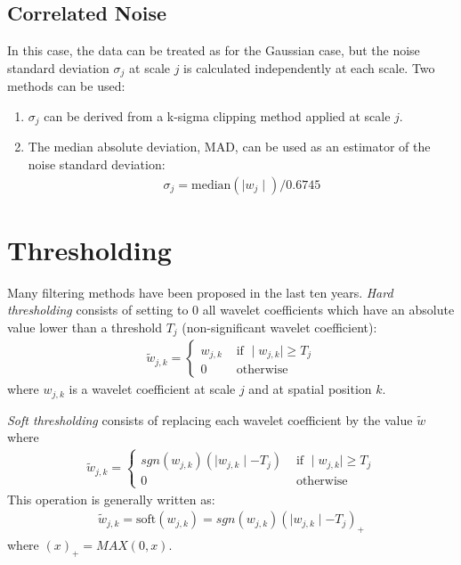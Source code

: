 \subsection{Correlated Noise}
In this case, the data can be treated as for the Gaussian case, but the noise standard deviation $\sigma_j$ at scale $j$ 
is calculated independently at each scale. Two methods can be used: 
\begin{enumerate}
\item $\sigma_j$ can be derived from a k-sigma clipping method applied at scale $j$.
\item The median absolute deviation, MAD, can be used as an estimator of the noise standard deviation:
\begin{eqnarray}
\sigma_j = \mbox{median}( \mid w_j \mid ) / 0.6745
\end{eqnarray}
\end{enumerate}

\section{Thresholding}
Many filtering methods have been proposed in the last ten years. {\em Hard thresholding} consists of setting to 0 all 
wavelet coefficients which have an absolute value lower than a threshold $T_j$ (non-significant wavelet coefficient):
\begin{eqnarray}  \tilde w_{j,k} = 
\left\{ \begin{array}{ll} w_{j,k} &  \mbox{ if } \mid w_{j,k} \mid \geq T_j  \nonumber  \\ 

0 &  \mbox{ otherwise}  \end{array} \right. 
\end{eqnarray}
where $w_{j,k}$ is a wavelet coefficient at scale $j$ and at spatial position $k$. 

{\em Soft thresholding} consists of replacing each wavelet coefficient by the value $\tilde w$ where
\begin{eqnarray}  \tilde w_{j,k} = 
\left\{ \begin{array}{ll} sgn(w_{j,k}) ( \mid w_{j,k} \mid - T_j)    &  \mbox{ if } \mid w_{j,k} \mid \geq T_j \nonumber  \\ 
0 &  \mbox{ otherwise}  \end{array} \right. 
\end{eqnarray} 
This operation is generally written as:
\begin{eqnarray} 
 \tilde w_{j,k} = \mathrm{soft}( w_{j,k})  = sgn(w_{j,k}) ( \mid w_{j,k} \mid - T_j)_{+}
\end{eqnarray} 
where $(x)_{+} = MAX(0,x)$.

